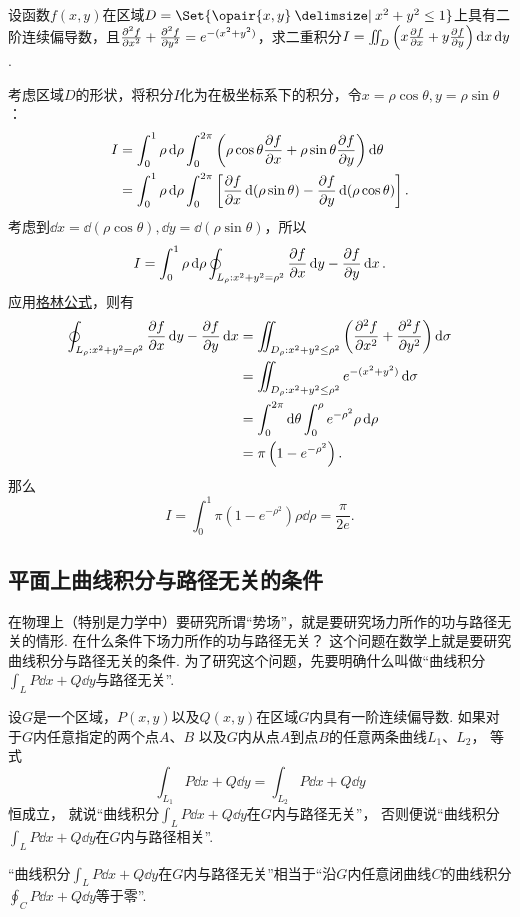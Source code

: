 \begin{example}
设函数\(f(x,y)\)在区域\(D=\Set{\opair{x,y} \given x^2+y^2\leq1}\)上具有二阶连续偏导数，且\(\pdv[2]{f}{x}+\pdv[2]{f}{y}=e^{-(x^2+y^2)}\)，求二重积分\(I=\iint_D\left(x\pdv{f}{x}+y\pdv{f}{y}\right)\dd{x}\dd{y}\).
\begin{solution}
考虑区域\(D\)的形状，将积分\(I\)化为在极坐标系下的积分，令\(x=\rho\cos\theta, y=\rho\sin\theta\)：\begin{align*}
I &= \int_0^1 \rho\dd{\rho} \int_0^{2\pi} \left(\rho\cos\theta\pdv{f}{x}+\rho\sin\theta\pdv{f}{y}\right) \dd{\theta} \\
&= \int_0^1 \rho\dd{\rho} \int_0^{2\pi} \left[\pdv{f}{x}\dd(\rho\sin\theta)-\pdv{f}{y}\dd(\rho\cos\theta)\right].
\end{align*}
考虑到\(\dd{x}=\dd(\rho\cos\theta), \dd{y}=\dd(\rho\sin\theta)\)，所以\[
I = \int_0^1 \rho\dd{\rho} \oint_{L_{\rho}: x^2+y^2=\rho^2} \pdv{f}{x}\dd{y}-\pdv{f}{y}\dd{x}.
\]应用\hyperref[equation:线积分与面积分.格林公式]{格林公式}，则有\begin{align*}
\oint_{L_{\rho}: x^2+y^2=\rho^2} \pdv{f}{x}\dd{y}-\pdv{f}{y}\dd{x}
&= \iint_{D_{\rho}: x^2+y^2\leq\rho^2} \left(\pdv[2]{f}{x}+\pdv[2]{f}{y}\right) \dd{\sigma} \\
&= \iint_{D_{\rho}: x^2+y^2\leq\rho^2} e^{-(x^2+y^2)} \dd{\sigma} \\
&= \int_0^{2\pi} \dd{\theta} \int_0^{\rho} e^{-\rho^2} \rho\dd{\rho} \\
&= \pi \left(1-e^{-\rho^2}\right).
\end{align*}
那么\[
I = \int_0^1 \pi \left(1-e^{-\rho^2}\right) \rho\dd{\rho}
=  \frac{\pi}{2e}.
\]
\end{solution}
\end{example}

\subsection{平面上曲线积分与路径无关的条件}
在物理上（特别是力学中）要研究所谓“势场”，就是要研究场力所作的功与路径无关的情形.
在什么条件下场力所作的功与路径无关？
这个问题在数学上就是要研究曲线积分与路径无关的条件.
为了研究这个问题，先要明确什么叫做“曲线积分\(\int_L P\dd{x}+Q\dd{y}\)与路径无关”.
\begin{definition}
设\(G\)是一个区域，\(P(x,y)\)以及\(Q(x,y)\)在区域\(G\)内具有一阶连续偏导数.
如果对于\(G\)内任意指定的两个点\(A\)、\(B\)
以及\(G\)内从点\(A\)到点\(B\)的任意两条曲线\(L_1\)、\(L_2\)，
等式\[
\int_{L_1}{P\dd{x}+Q\dd{y}}
=\int_{L_2}{P\dd{x}+Q\dd{y}}
\]恒成立，
就说“曲线积分\(\int_L P\dd{x}+Q\dd{y}\)在\(G\)内与路径无关”，
否则便说“曲线积分\(\int_L P\dd{x}+Q\dd{y}\)在\(G\)内与路径相关”.
\end{definition}
“曲线积分\(\int_L P\dd{x}+Q\dd{y}\)在\(G\)内与路径无关”相当于“沿\(G\)内任意闭曲线\(C\)的曲线积分\(\oint_C P\dd{x}+Q\dd{y}\)等于零”.

